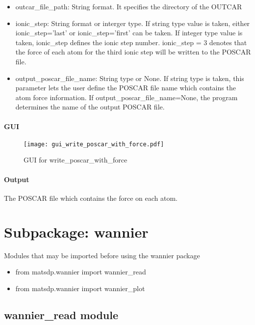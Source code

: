 \documentclass[12pt]{book}
\begin{document}
\begin{itemize}
\item outcar\_file\_path: String format. It specifies the directory of the OUTCAR
\item ionic\_step: String format or interger type. If string type value is taken, either ionic\_step='last' or ionic\_step='first' can be taken. If integer type value is taken, ionic\_step defines the ionic step number. ionic\_step = 3 denotes that the force of each atom for the third ionic step will be written to the POSCAR file.
\item output\_poscar\_file\_name: String type or None. If string type is taken, this parameter lets the user define the POSCAR file name which contains the atom force information. If output\_poscar\_file\_name=None, the program determines the name of the output POSCAR file. 
\end{itemize}

\subsubsection{GUI}

\begin{figure}[htbp]
\centering
\texttt{[image: gui\_write\_poscar\_with\_force.pdf]}
\caption{GUI for write\_poscar\_with\_force}
\label{fig:GUI_write_poscar_with_force}
\end{figure}

\subsubsection{Output}

The POSCAR file which contains the force on each atom.

\chapter{Subpackage: wannier}

Modules that may be imported before using the wannier package
\begin{itemize}
\item from matsdp.wannier import wannier\_read
\item from matsdp.wannier import wannier\_plot
\end{itemize}

\section{wannier\_read module}
\end{document}
